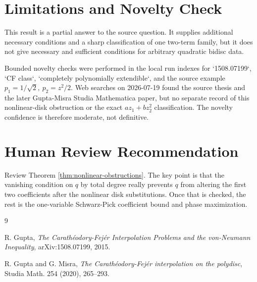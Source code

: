 \documentclass[11pt]{article}
\begin{document}
\section*{Limitations and Novelty Check}

This result is a partial answer to the source question.  It supplies additional
necessary conditions and a sharp classification of one two-term family, but it
does not give necessary and sufficient conditions for arbitrary quadratic
bidisc data.

Bounded novelty checks were performed in the local run indexes for
`1508.07199`, `CF class`, `completely polynomially extendible`, and the source
example \(p_1=1/\sqrt2,\ p_2=z^2/2\).  Web searches on 2026-07-19 found the
source thesis and the later Gupta-Misra Studia Mathematica paper, but no
separate record of this nonlinear-disk obstruction or the exact
\(a z_1+b z_2^2\) classification.  The novelty confidence is therefore
moderate, not definitive.

\section*{Human Review Recommendation}

Review Theorem \ref{thm:nonlinear-obstructions}.  The key point is that the
vanishing condition on \(q\) by total degree really prevents \(q\) from
altering the first two coefficients after the nonlinear disk substitutions.
Once that is checked, the rest is the one-variable Schwarz-Pick coefficient
bound and phase maximization.

\begin{thebibliography}{9}

R. Gupta,
\emph{The Carath\'eodory-Fej\'er Interpolation Problems and the von-Neumann
Inequality},
arXiv:1508.07199, 2015.

R. Gupta and G. Misra,
\emph{The Carath\'eodory-Fej\'er interpolation on the polydisc},
Studia Math. 254 (2020), 265--293.

\end{thebibliography}
\end{document}
